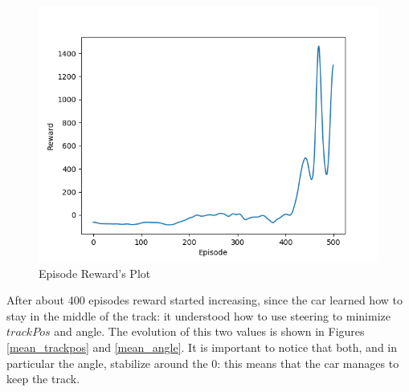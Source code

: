 \documentclass[Lau,oneside,noexaminfo]{sapthesis} %
\begin{document}
\begin{figure}[H]
  \centering
  \includegraphics[width=.8\textwidth]{mean_reward}
  \caption{Episode Reward's Plot}
  \label{rewardplot}
\end{figure}

After about 400 episodes reward started increasing, since the car learned how to stay in the middle of the track: it understood how to use steering to minimize $trackPos$ and angle. The evolution of this two values is shown in Figures \ref{mean_trackpos} and \ref{mean_angle}. It is important to notice that both, and in particular the angle, stabilize around the $0$: this means that the car manages to keep the track.
\end{document}
